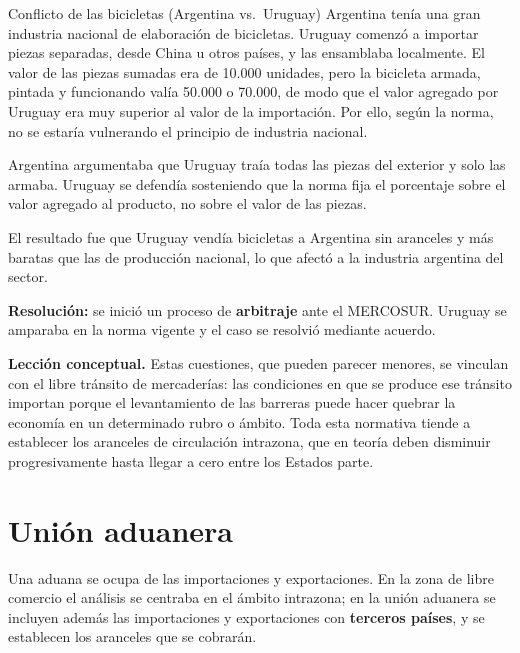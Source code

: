 \documentclass[12pt,oneside]{book}
\begin{document}
\begin{example}{Conflicto de las bicicletas (Argentina vs.\ Uruguay)}
Argentina tenía una gran industria nacional de elaboración de bicicletas. Uruguay comenzó a importar piezas separadas, desde China u otros países, y las ensamblaba localmente. El valor de las piezas sumadas era de 10.000 unidades, pero la bicicleta armada, pintada y funcionando valía 50.000 o 70.000, de modo que el valor agregado por Uruguay era muy superior al valor de la importación. Por ello, según la norma, no se estaría vulnerando el principio de industria nacional.

Argentina argumentaba que Uruguay traía todas las piezas del exterior y solo las armaba. Uruguay se defendía sosteniendo que la norma fija el porcentaje sobre el valor agregado al producto, no sobre el valor de las piezas.

El resultado fue que Uruguay vendía bicicletas a Argentina sin aranceles y más baratas que las de producción nacional, lo que afectó a la industria argentina del sector.

\textbf{Resolución:} se inició un proceso de \textbf{arbitraje} ante el MERCOSUR. Uruguay se amparaba en la norma vigente y el caso se resolvió mediante acuerdo.
\end{example}

\textbf{Lección conceptual.} Estas cuestiones, que pueden parecer menores, se vinculan con el libre tránsito de mercaderías: las condiciones en que se produce ese tránsito importan porque el levantamiento de las barreras puede hacer quebrar la economía en un determinado rubro o ámbito. Toda esta normativa tiende a establecer los aranceles de circulación intrazona, que en teoría deben disminuir progresivamente hasta llegar a cero entre los Estados parte.

\section{Unión aduanera}

Una aduana se ocupa de las importaciones y exportaciones. En la zona de libre comercio el análisis se centraba en el ámbito intrazona; en la unión aduanera se incluyen además las importaciones y exportaciones con \textbf{terceros países}, y se establecen los aranceles que se cobrarán.
\end{document}

